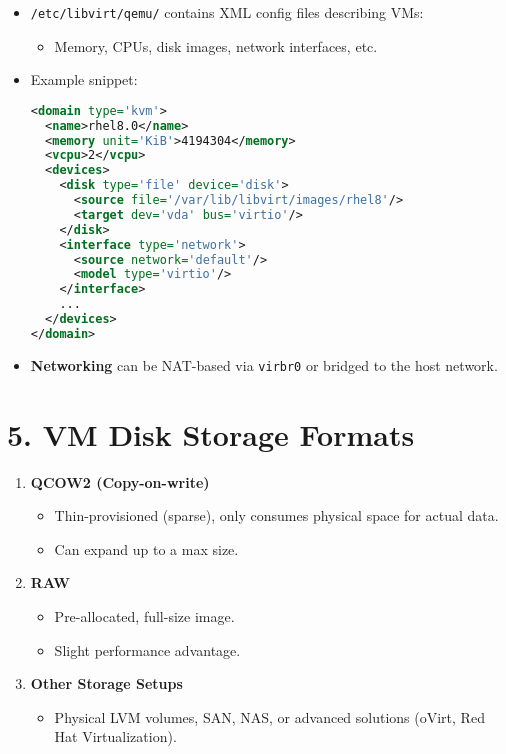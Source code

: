 \documentclass[a4paper]{report}
\begin{document}
\begin{itemize}
    \item \texttt{/etc/libvirt/qemu/} contains XML config files describing VMs:
    \begin{itemize}
        \item Memory, CPUs, disk images, network interfaces, etc.
    \end{itemize}
    \item Example snippet:
    \begin{lstlisting}[language=xml]
<domain type='kvm'>
  <name>rhel8.0</name>
  <memory unit='KiB'>4194304</memory>
  <vcpu>2</vcpu>
  <devices>
    <disk type='file' device='disk'>
      <source file='/var/lib/libvirt/images/rhel8'/>
      <target dev='vda' bus='virtio'/>
    </disk>
    <interface type='network'>
      <source network='default'/>
      <model type='virtio'/>
    </interface>
    ...
  </devices>
</domain>
    \end{lstlisting}
    \item \textbf{Networking} can be NAT-based via \texttt{virbr0} or bridged to the host network.
\end{itemize}

\section*{5. VM Disk Storage Formats}

\begin{enumerate}
    \item \textbf{QCOW2 (Copy-on-write)}
    \begin{itemize}
        \item Thin-provisioned (sparse), only consumes physical space for actual data.
        \item Can expand up to a max size.
    \end{itemize}

    \item \textbf{RAW}
    \begin{itemize}
        \item Pre-allocated, full-size image.
        \item Slight performance advantage.
    \end{itemize}

    \item \textbf{Other Storage Setups}
    \begin{itemize}
        \item Physical LVM volumes, SAN, NAS, or advanced solutions (oVirt, Red Hat Virtualization).
    \end{itemize}
\end{enumerate}
\end{document}

